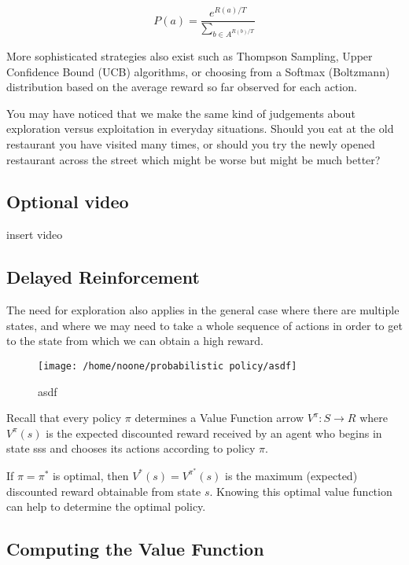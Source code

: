 \documentclass[11pt]{article}
\begin{document}
\[P(a) = \dfrac{e^{R(a)/T}}{\sum_{b \in A^{R(b)/T}}}\]

More sophisticated strategies also exist such as Thompson Sampling, Upper
Confidence Bound (UCB) algorithms, or choosing from a Softmax (Boltzmann)
distribution based on the average reward so far observed for each action.

You may have noticed that we make the same kind of judgements about exploration
versus exploitation in everyday situations.
Should you eat at the old restaurant you have visited many times, or should you
try the newly opened restaurant across the street which might be worse but
might be much better?

\subsection{Optional video}\label{subsec:optional-video3}
insert video

\subsection{Delayed Reinforcement}\label{subsec:delayed-reinforcement}
The need for exploration also applies in the general case where there are
multiple states, and where we may need to take a whole sequence of actions in
order to get to the state from which we can obtain a high reward.

\begin{figure}[h]
    \centering
    \texttt{[image: /home/noone/probabilistic policy/asdf]}
    \caption[asdf]{asdf}
    \label{fig:asdf}
\end{figure}

Recall that every policy $\pi$ determines a Value Function arrow
$V^{\pi}: S \to R$ where $V^{\pi}(s)$ is the expected discounted reward
received by an agent who begins in state sss and chooses its actions according
to policy $\pi$.

If $\pi = \pi^*$ is optimal, then $V^* (s) = V^{\pi^*}(s)$ is the maximum
(expected) discounted reward obtainable from state $s$.
Knowing this optimal value function can help to determine the optimal policy.

\subsection{Computing the Value Function}\label{subsec:computing-the-value-function}
\end{document}
